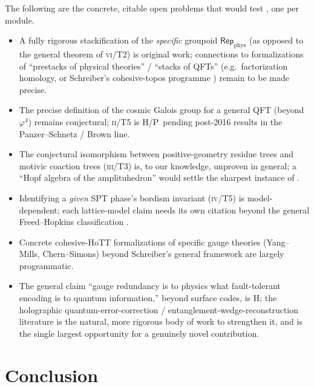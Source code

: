 \documentclass[12pt]{article}
\theoremstyle{definition}
\theoremstyle{remark}
\newcommand{\Repphys}{\mathsf{Rep}_{\mathrm{phys}}}
\newcommand{\Hstat}{\textsf{H}}
\newcommand{\Pstat}{\textsf{P}}
\newcommand{\PI}{\textsc{i}}
\newcommand{\PII}{\textsc{ii}}
\newcommand{\PIII}{\textsc{iii}}
\newcommand{\PIV}{\textsc{iv}}
\newcommand{\PV}{\textsc{v}}
\newcommand{\PVI}{\textsc{vi}}
\begin{document}
The following are the concrete, citable open problems that would test
, one per module.

\begin{itemize}[leftmargin=2.2em]
\item[\PI.] A fully rigorous stackification of the \emph{specific} groupoid
$\Repphys$ (as opposed to the general theorem of \PVI/T2) is original work; connections
to formalizations of ``prestacks of physical theories'' / ``stacks of QFTs'' (e.g.\
factorization homology, or Schreiber's cohesive-topos programme \cite{Schreiber2013})
remain to be made precise.
\item[\PII.] The precise definition of the cosmic Galois group for a general QFT (beyond
$\varphi^4$) remains conjectural; \PII/T5 is \Hstat/\Pstat\ pending post-2016 results in
the Panzer--Schnetz \cite{PanzerSchnetz2016} / Brown \cite{Brown2015Cosmic} line.
\item[\PIII.] The conjectural isomorphism between positive-geometry residue trees and
motivic coaction trees (\PIII/T3) is, to our knowledge, unproven in general; a ``Hopf
algebra of the amplituhedron'' would settle the sharpest instance of \Cref{prin:dec}.
\item[\PIV.] Identifying a \emph{given} SPT phase's bordism invariant (\PIV/T5) is
model-dependent; each lattice-model claim needs its own citation beyond the general
Freed--Hopkins classification \cite{FreedHopkins2016}.
\item[\PV.] Concrete cohesive-HoTT formalizations of specific gauge theories
(Yang--Mills, Chern--Simons) beyond Schreiber's general framework are largely
programmatic.
\item[\PVI.] The general claim ``gauge redundancy is to physics what fault-tolerant
encoding is to quantum information,'' beyond surface codes, is \Hstat; the holographic
quantum-error-correction / entanglement-wedge-reconstruction literature is the natural,
more rigorous body of work to strengthen it, and is the single largest opportunity for
a genuinely novel contribution.
\end{itemize}

\section{Conclusion}
\label{sec:conclusion}
\end{document}
